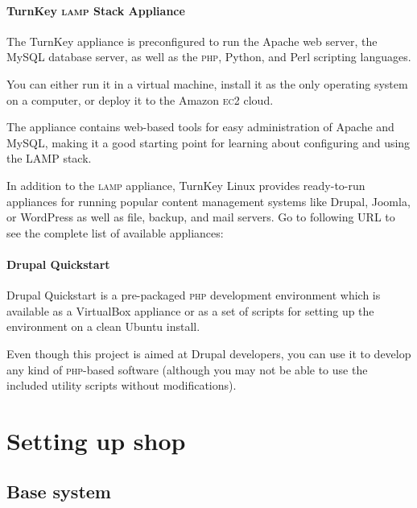\documentclass[draft,ebook,10pt,twoside,openright]{memoir}
\begin{document}
\subsection*{TurnKey \textsc{lamp} Stack Appliance}

The TurnKey appliance is preconfigured to run the Apache web server, the MySQL database server, as well as the \textsc{php}, Python, and Perl scripting languages.


You can either run it in a virtual machine, install it as the only operating system on a computer, or deploy it to the Amazon \textsc{ec2} cloud.

The appliance contains web-based tools for easy administration of Apache and MySQL, making it a good starting point for learning about configuring and using the \textsc{LAMP} stack.

In addition to the \textsc{lamp} appliance, TurnKey Linux provides ready-to-run appliances for running popular content management systems like Drupal, Joomla, or WordPress as well as file, backup, and mail servers. Go to following URL to see the complete list of available appliances:


\subsection*{Drupal Quickstart}

Drupal Quickstart is a pre-packaged \textsc{php} development environment which is available as a VirtualBox appliance or as a set of scripts for setting up the environment on a clean Ubuntu install.


Even though this project is aimed at Drupal developers, you can use it to develop any kind of \textsc{php}-based software (although you may not be able to use the included utility scripts without modifications).

\mainmatter

\part{Setting up shop}

\chapter{Base system} \label{chbasesystem}
\end{document}
